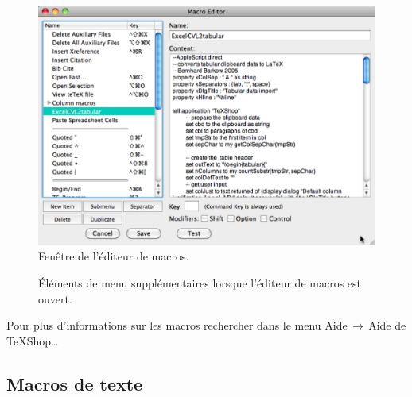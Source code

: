 \documentclass[11pt,french]{article}
\newcommand{\cmd}[1]{\textsf{#1}}
\newcommand{\mnu}[1]{\textsf{#1}}
\newcommand{\To}{\,\(\to\)\,}
\begin{document}
\begin{figure}
\centering
\includegraphics[width=4.75in]{figs/MacroEditorWindow}
\caption{Fenêtre de l'éditeur de macros.}
\label{fig:MacroEditorWindow}
\end{figure}

\begin{figure}
\centering
{}
\caption{Éléments de menu supplémentaires lorsque l'éditeur de macros est ouvert.}
\label{fig:MacrosMenu}
\end{figure}

Pour plus d'informations sur les \cmd{macros} rechercher dans le menu \mnu{Aide}\To\mnu{Aide de TeXShop…}


\subsection{Macros de texte}
\end{document}
